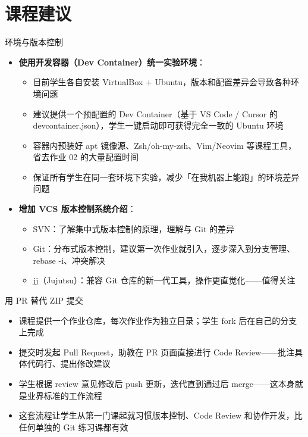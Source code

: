 \section{课程建议}

\begin{frame}{环境与版本控制}
\begin{itemize}
  \item \textbf{使用开发容器（Dev Container）统一实验环境}：
    \begin{itemize}
      \item 目前学生各自安装 VirtualBox + Ubuntu，版本和配置差异会导致各种环境问题
      \item 建议提供一个预配置的 Dev Container（基于 VS Code / Cursor 的 devcontainer.json），学生一键启动即可获得完全一致的 Ubuntu 环境
      \item 容器内预装好 apt 镜像源、Zsh/oh-my-zsh、Vim/Neovim 等课程工具，省去作业 02 的大量配置时间
      \item 保证所有学生在同一套环境下实验，减少「在我机器上能跑」的环境差异问题
    \end{itemize}
  \item \textbf{增加 VCS 版本控制系统介绍}：
    \begin{itemize}
      \item SVN：了解集中式版本控制的原理，理解与 Git 的差异
      \item Git：分布式版本控制，建议第一次作业就引入，逐步深入到分支管理、rebase -i、冲突解决
      \item jj（Jujutsu）：兼容 Git 仓库的新一代工具，操作更直觉化——值得关注
    \end{itemize}
\end{itemize}
\end{frame}

\begin{frame}{用 PR 替代 ZIP 提交}
\begin{itemize}
  \item 课程提供一个作业仓库，每次作业作为独立目录；学生 fork 后在自己的分支上完成
  \item 提交时发起 Pull Request，助教在 PR 页面直接进行 Code Review——批注具体代码行、提出修改建议
  \item 学生根据 review 意见修改后 push 更新，迭代直到通过后 merge——这本身就是业界标准的工作流程
  \item 这套流程让学生从第一门课起就习惯版本控制、Code Review 和协作开发，比任何单独的 Git 练习课都有效
\end{itemize}
\end{frame}
